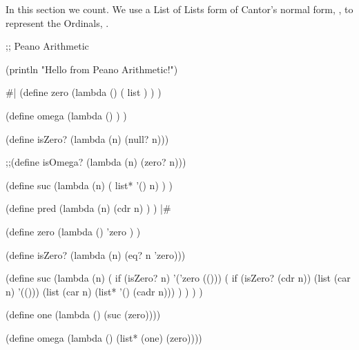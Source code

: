 
In this section we count. We use a List of Lists form of Cantor's normal form,
\cite[Theorem 2.26]{jech2003setTheory}, to represent the Ordinals, \Ordinal{}.

\begin{bnf*}
\end{bnf*}

\begin{racket}
;; Peano Arithmetic

(println "Hello from Peano Arithmetic!")

#|
(define zero (lambda () ( list ) ) )

(define omega (lambda () ) )

(define isZero? (lambda (n) (null? n)))

;;(define isOmega? (lambda (n) (zero? n)))

(define suc (lambda (n) ( list* '() n) ) )

(define pred (lambda (n) (cdr n) ) )
|#

(define zero (lambda () 'zero ) )

(define isZero? (lambda (n) (eq? n 'zero)))

(define suc
  (lambda (n)
    ( if (isZero? n)
      '('zero (()))
      ( if (isZero? (cdr n))
        (list (car n) '(()))
        (list (car n) (list* '() (cadr n)))
      )
    )
  )
)

(define one (lambda () (suc (zero))))

(define omega (lambda () (list* (one) (zero))))
\end{racket}